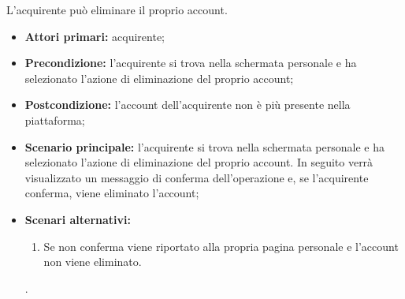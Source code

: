 L'acquirente può eliminare il proprio account.
\begin{itemize}
    \item \textbf{Attori primari:} acquirente;
    \item \textbf{Precondizione:} l'acquirente si trova nella schermata personale e ha selezionato l'azione di eliminazione del proprio account;
    \item \textbf{Postcondizione:} l'account dell'acquirente non è più presente nella piattaforma;
    \item \textbf{Scenario principale:} l'acquirente si trova nella schermata personale e ha selezionato l'azione di eliminazione del proprio account. In seguito verrà visualizzato un messaggio di conferma dell'operazione e, se l'acquirente conferma, viene eliminato l'account;
    \item \textbf{Scenari alternativi:}
    \begin{enumerate}[label=\lett]
        \item Se non conferma viene riportato alla propria pagina personale e l'account non viene eliminato.
    \end{enumerate}.
\end{itemize}
